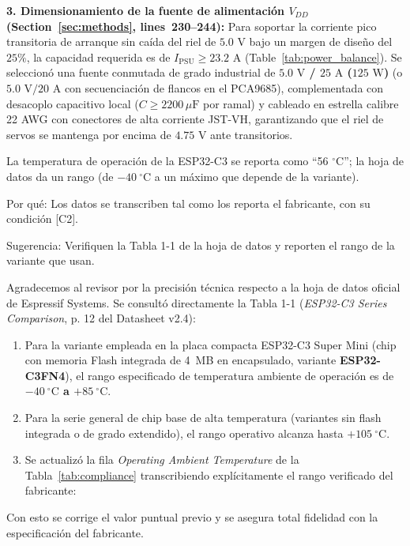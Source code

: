 \documentclass{LabDSTresponse}
\begin{document}
{\textbf{3. Dimensionamiento de la fuente de alimentación $V_{DD}$ (Section~\ref{sec:methods}, lines~230--244):}
Para soportar la corriente pico transitoria de arranque sin caída del riel de $5.0\text{ V}$ bajo un margen de diseño del $25\%$, la capacidad requerida es de $I_{\text{PSU}} \ge 23.2\text{ A}$ (Table~\ref{tab:power_balance}). Se seleccionó una fuente conmutada de grado industrial de \textbf{$5.0\text{ V}$ / $25\text{ A}$ ($125\text{ W}$)} (o $5.0\text{ V} / 20\text{ A}$ con secuenciación de flancos en el PCA9685), complementada con desacoplo capacitivo local ($C \ge 2200\,\mu\text{F}$ por ramal) y cableado en estrella calibre 22 AWG con conectores de alta corriente JST-VH, garantizando que el riel de servos se mantenga por encima de $4.75\text{ V}$ ante transitorios.}

{La temperatura de operación de la ESP32-C3 se reporta como “56 $^\circ$C”; la hoja de datos da un rango (de $-40~^\circ\text{C}$ a un máximo que depende de la variante).

Por qué: Los datos se transcriben tal como los reporta el fabricante, con su condición [C2].

Sugerencia: Verifiquen la Tabla 1-1 de la hoja de datos y reporten el rango de la variante que usan.}
{Agradecemos al revisor por la precisión técnica respecto a la hoja de datos oficial de Espressif Systems. Se consultó directamente la Tabla 1-1 (\textit{ESP32-C3 Series Comparison}, p. 12 del Datasheet v2.4):
\begin{enumerate}
    \item Para la variante empleada en la placa compacta ESP32-C3 Super Mini (chip con memoria Flash integrada de 4~MB en encapsulado, variante \textbf{ESP32-C3FN4}), el rango especificado de temperatura ambiente de operación es de \textbf{$-40~^\circ\text{C}$ a $+85~^\circ\text{C}$}.
    \item Para la serie general de chip base de alta temperatura (variantes sin flash integrada o de grado extendido), el rango operativo alcanza hasta $+105~^\circ\text{C}$.
    \item Se actualizó la fila \textit{Operating Ambient Temperature} de la Tabla~\ref{tab:compliance} transcribiendo explícitamente el rango verificado del fabricante:
\end{enumerate}
Con esto se corrige el valor puntual previo y se asegura total fidelidad con la especificación del fabricante.}
\end{document}
